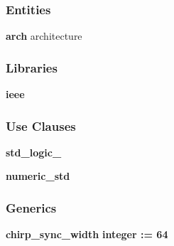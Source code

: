 \subsubsection*{Entities}
\begin{DoxyCompactItemize}
\item 
{\bf arch} architecture
\end{DoxyCompactItemize}
\subsubsection*{Libraries}
 \begin{DoxyCompactItemize}
\item 
{\bf ieee} 
\end{DoxyCompactItemize}
\subsubsection*{Use Clauses}
 \begin{DoxyCompactItemize}
\item 
{\bf std\+\_\+logic\+\_}   
\item 
{\bf numeric\+\_\+std}   
\end{DoxyCompactItemize}
\subsubsection*{Generics}
 \begin{DoxyCompactItemize}
\item 
{\bf chirp\+\_\+sync\+\_\+width} {\bfseries {\bfseries \textcolor{comment}{integer}\textcolor{vhdlchar}{ }\textcolor{vhdlchar}{ }\textcolor{vhdlchar}{\+:}\textcolor{vhdlchar}{=}\textcolor{vhdlchar}{ }\textcolor{vhdlchar}{ } \textcolor{vhdldigit}{64} \textcolor{vhdlchar}{ }}}
\end{DoxyCompactItemize}
